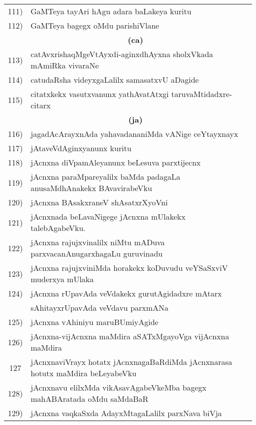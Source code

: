 {\begin{longtable}{@{}cp{7.4cm}r}
111) & GaMTeya tayAri hAgu adara baLakeya kuritu & \pageref{page148}\\
112) & GaMTeya bagegx oMdu parishiVlane & \pageref{page170}\\[0.3cm]
     & \multicolumn{1}{c}{\textbf{(ca)}} & \\[0.3cm]    
113) & catAvxrishaqMgeVtAyxdi-aginxdhAyxna sholxVkada mAmiRka vivaraNe &  \pageref{page209}\\
114) & catudaRsha videyxgaLalilx samasatxvU aDagide & \pageref{page197}\\
115) & citatxkekx vasutxvanunx yathAvatAtxgi taruvaMtidadxre-citarx & \pageref{page200}\\[0.3cm]
     &  \multicolumn{1}{c}{\textbf{(ja)}}  & \\[0.3cm]
116) & jagadAcArayxnAda yahavadananiMda vANige ceYtayxnayx &   \pageref{page128}\\
117) & jAtaveVdAginxyanunx kuritu & \pageref{page212}\\
118) & jAcnxna diVpamAleyanunx beLesuva parxtijecnx &   \pageref{page81}\\
119) & jAcnxna paraMpareyalilx baMda padagaLa anusaMdhAnakekx BAvavirabeVku & \pageref{page140}\\
120) & jAcnxna BAsakxraneV shAsatxrXyoVni & \pageref{page168}\\
121) & jAcnxnada beLavaNigege jAcnxna mUlakekx talebAgabeVku. & \pageref{page68}\\
122) & jAcnxna rajujxvinalilx niMtu mADuva parxvacanAnugarxhagaLu guruvinadu & \pageref{page82}\\ 
123) & jAcnxna rajujxviniMda horakekx koDuvudu veYSaSxviV muderxya mUlaka & \pageref{page83}\\
124) & jAcnxna rUpavAda veVdakekx gurutAgidadxre mAtarx & \\
     & sAhitayxrUpavAda veVdavu parxmANa  & \pageref{page137}\\
125) & jAcnxna vAhiniyu maruBUmiyAgide & \pageref{page110}\\
126) & jAcnxna-vijAcnxna maMdira aSATxMgayoVga vijAcnxna maMdira & \pageref{page73}\\
127  & jAcnxnaviVrayx hotatx jAcnxnagaBaRdiMda jAcnxnarasa hotutx maMdira beLeyabeVku & \pageref{page79}\\ 
128) & jAcnxnavu elilxMda vikAsavAgabeVkeMba bagegx mahABAratada oMdu saMdaBaR & \pageref{page162}\\
129) & jAcnxna vaqkaSxda AdayxMtagaLalilx parxNava biVja & \pageref{page138}\\

\end{longtable}}
